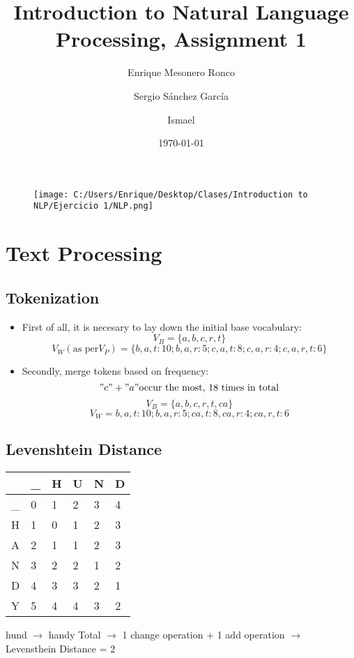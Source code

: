\documentclass{article}
\title{ Introduction to Natural Language Processing, Assignment 1 }
\author{ Enrique Mesonero Ronco \and Sergio Sánchez García \and Ismael }
\date{\today}
\begin{document}
\maketitle
\begin{figure}[h!]
	\texttt{[image: C:/Users/Enrique/Desktop/Clases/Introduction to NLP/Ejercicio 1/NLP.png]}
\end{figure}
\newpage
\tableofcontents
\newpage
\section { Text Processing }
	\subsection { Tokenization }
	 \begin{itemize}
	\item First of all, it is necesary to lay down the initial base vocabulary:
		\begin{equation*}
			V_B = \{a,b,c,r,t\}
		\end{equation*}
		\begin{equation*}
			V_W (\text{as per} V_P) = \{b, a, t: 10; b, a, r: 5; c, a, t: 8; c, a, r: 4; c, a, r, t: 6\}
		\end{equation*}

	\item Secondly, merge tokens based on frequency:
		\begin{equation*}
			"c" + "a" \text{occur the most, 18 times in total}
		\end{equation*}
		\begin{equation*}
			V_B=\{a,b,c,r,t,ca\}
		\end{equation*}
		\begin{equation*}
			V_W={b, a, t: 10; b, a, r: 5; ca, t: 8, ca, r: 4; ca, r, t: 6}
		\end{equation*}
	\end{itemize}
	\subsection { Levenshtein Distance }

	\begin{center}
	\begin{tabular} { | m{1cm} | m{1cm} | m{1cm} | m{1cm} | m{1cm} | m{1cm} | }
		\hline
		 & \_ & H & U & N & D \\
		\hline
		\_ & 0 & 1 & 2 & 3 & 4 \\
		\hline
		H & 1 & 0 & 1 & 2 & 3 \\
		\hline
		A & 2 & 1 & 1 & 2 & 3 \\
		\hline
		N & 3 & 2 & 2 & 1 & 2 \\
		\hline
		D & 4 & 3 & 3 & 2 & 1 \\
		\hline
		Y & 5 & 4 & 4 & 3 & 2  \\
		\hline
	\end{tabular}
	\end{center}
hund $\rightarrow$ handy Total $\rightarrow$ 1 change operation + 1 add operation $\rightarrow$ Levensthein Distance = 2
\end{document}
